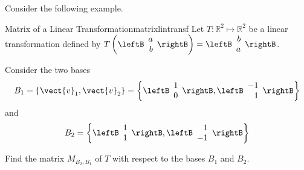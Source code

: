 Consider the following example.

\begin{example}{Matrix of a Linear Transformation}{matrixlintransf}
Let $T: \mathbb{R}^2 \mapsto \mathbb{R}^2$ be a linear transformation defined by $T \left( \leftB \begin{array}{r}
a \\
b
\end{array} \rightB \right) = \leftB \begin{array}{r}
b \\
a 
\end{array} \rightB$. 

Consider the two bases
\[
B_1 = \left\{ \vect{v}_{1}, \vect{v}_{2} \right\} = \left\{ \leftB \begin{array}{r}
1 \\
0
\end{array}\rightB, \leftB \begin{array}{r}
-1 \\
1
\end{array}
\rightB
\right\}
\]
 and 
\[
B_2 = \left\{ \leftB \begin{array}{r}
1 \\
1
\end{array}
\rightB, \leftB \begin{array}{r}
1 \\
-1
\end{array}
\rightB
\right\}
\]

Find the matrix $M_{B_2,B_1}$ of $T$ with respect to the bases $B_1$ and $B_2$. 
\end{example}

